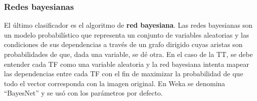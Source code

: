 \subsubsection{Redes bayesianas}

El último clasificador es el algoritmo de \textbf{red bayesiana}\cite{Bouckaert2008}. Las redes bayesianas son un modelo probabilístico que representa un conjunto de variables aleatorias y las condiciones de sus dependencias a través de un grafo dirigido cuyas aristas son probabilidades de que,  dada una variable, se dé otra. En el caso de la TT, se debe entender cada TF como una variable aleatoria y la red bayesiana intenta mapear las dependencias entre cada TF con el fin de maximizar la probabilidad de que todo el vector corresponda con la imagen original.
En Weka se denomina ``BayesNet'' y se usó con los parámetros por defecto.


